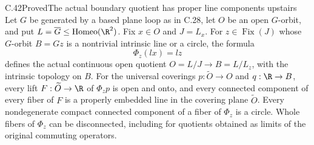 \begin{claim}{C.42}{Proved}{The actual boundary quotient has proper line components upstairs}
Let $G$ be generated by a based plane loop as in C.28,
let $O$ be an open $G$-orbit, and put
$L=\overline G\leq\operatorname{Homeo}(\R^2)$.
Fix $x\in O$ and $J=L_x$. For
$z\in\operatorname{Fix}(J)$ whose $G$-orbit $B=Gz$
is a nontrivial intrinsic line or a circle, the formula
\[
 \Phi_z(lx)=lz
\]
defines the actual continuous open quotient
$O=L/J\to B=L/L_z$, with the intrinsic topology on $B$.
For the universal coverings $p:\widetilde O\to O$
and $q:\R\to B$, every lift
$F:\widetilde O\to\R$ of $\Phi_zp$ is open and onto,
and every connected component of every fiber of $F$
is a properly embedded line in the covering plane
$\widetilde O$.
Every nondegenerate compact connected component of
a fiber of $\Phi_z$ is a circle.
Whole fibers of $\Phi_z$ can be disconnected, including
for quotients obtained as limits of the original
commuting operators.
\end{claim}

